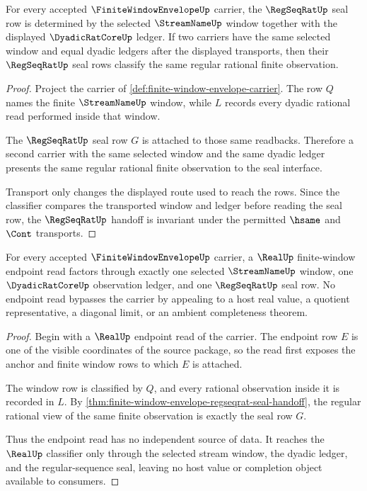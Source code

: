\begin{theorem}
\label{thm:finite-window-envelope-regseqrat-seal-handoff}
For every accepted $\FiniteWindowEnvelopeUp$ carrier, the $\RegSeqRatUp$ seal row is determined by the selected $\StreamNameUp$ window together with the displayed $\DyadicRatCoreUp$ ledger. If two carriers have the same selected window and equal dyadic ledgers after the displayed transports, then their $\RegSeqRatUp$ seal rows classify the same regular rational finite observation.
\end{theorem}
\begin{proof}
Project the carrier of \autoref{def:finite-window-envelope-carrier}. The row $Q$ names the finite $\StreamNameUp$ window, while $L$ records every dyadic rational read performed inside that window.

The $\RegSeqRatUp$ seal row $G$ is attached to those same readbacks. Therefore a second carrier with the same selected window and the same dyadic ledger presents the same regular rational finite observation to the seal interface.

Transport only changes the displayed route used to reach the rows. Since the classifier compares the transported window and ledger before reading the seal row, the $\RegSeqRatUp$ handoff is invariant under the permitted $\hsame$ and $\Cont$ transports.
\end{proof}

\begin{theorem}
\label{thm:finite-window-envelope-realup-window-exactness}
For every accepted $\FiniteWindowEnvelopeUp$ carrier, a $\RealUp$ finite-window endpoint read factors through exactly one selected $\StreamNameUp$ window, one $\DyadicRatCoreUp$ observation ledger, and one $\RegSeqRatUp$ seal row. No endpoint read bypasses the carrier by appealing to a host real value, a quotient representative, a diagonal limit, or an ambient completeness theorem.
\end{theorem}
\begin{proof}
Begin with a $\RealUp$ endpoint read of the carrier. The endpoint row $E$ is one of the visible coordinates of the source package, so the read first exposes the anchor and finite window rows to which $E$ is attached.

The window row is classified by $Q$, and every rational observation inside it is recorded in $L$. By \autoref{thm:finite-window-envelope-regseqrat-seal-handoff}, the regular rational view of the same finite observation is exactly the seal row $G$.

Thus the endpoint read has no independent source of data. It reaches the $\RealUp$ classifier only through the selected stream window, the dyadic ledger, and the regular-sequence seal, leaving no host value or completion object available to consumers.
\end{proof}

